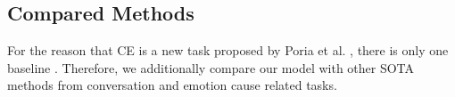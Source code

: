 \documentclass{article}
\begin{document}
\begin{table}[]
\centering
{}
\caption{Results of all models on RECCON-DD.  denotes that our method is significant against the best baseline DAG-ERC (p-value0.05) with the paired T-test.  denotes the results referred from Poria et al.~[2021]. }
\vspace{-0.05cm}
\label{main}
\end{table}

\subsection{Compared Methods}

For the reason that CE is a new task proposed by Poria et al. , there is only one baseline \cite{RECCON}. Therefore, we additionally compare our model with other SOTA methods from conversation and emotion cause related tasks. 
\end{document}
